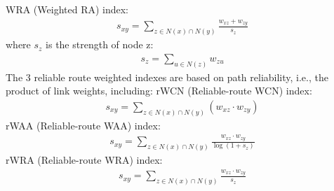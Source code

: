 \documentclass[letterpaper]{article}
\begin{document}
WRA (Weighted RA) index:
\begin{align*}
	s_{xy} = \sum_{z \in N(x) \cap N(y)} \frac{w_{xz} + w_{zy}}{s_z}
\end{align*}
where $ s_z $ is the strength of node z:
\begin{align*}
	s_z = \sum_{u \in N(z)} w_{zu}
\end{align*}
The 3 reliable route weighted indexes are based on path reliability,
i.e., the product of link weights, including:
rWCN (Reliable-route WCN) index:
\begin{align*}
	s_{xy} = \sum_{z \in N(x) \cap N(y)} (w_{xz} \cdot w_{zy})
\end{align*}
rWAA (Reliable-route WAA) index:
\begin{align*}
	s_{xy} = \sum_{z \in N(x) \cap N(y)} \frac{w_{xz} \cdot w_{zy}}{\log(1 + s_z)}
\end{align*}
rWRA (Reliable-route WRA) index:
\begin{align*}
	s_{xy} = \sum_{z \in N(x) \cap N(y)} \frac{w_{xz} \cdot w_{zy}}{s_z}
\end{align*}
\end{document}
